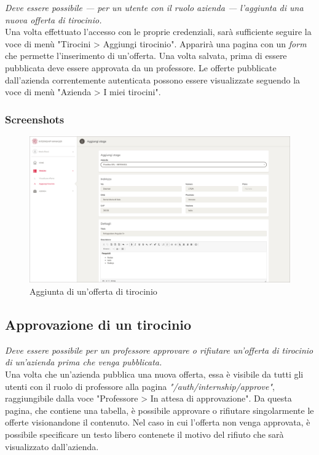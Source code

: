 \textit{Deve essere possibile --- per un utente con il ruolo azienda --- l'aggiunta di una nuova offerta di tirocinio.} \\

\noindent
Una volta effettuato l'accesso con le proprie credenziali, sarà sufficiente seguire la voce di menù "Tirocini > Aggiungi tirocinio". Apparirà una pagina con un \textit{form} che permette l'inserimento di un'offerta. Una volta salvata, prima di essere pubblicata deve essere approvata da un professore. Le offerte pubblicate dall'azienda correntemente autenticata possono essere visualizzate seguendo la voce di menù "Azienda > I miei tirocini".

\subsubsection{Screenshots}
\begin{figure}[H]
	\centering
		\includegraphics[width=1\textwidth]{Chapter3/Figs/screenshots/addinternship}     
	\caption[Screenshot: aggiunta di un'offerta di tirocinio]{Aggiunta di un'offerta di tirocinio}
	\label{fig:screenshot:2}
\end{figure}

\pagebreak
\subsection{Approvazione di un tirocinio}\label{sec:approvazione-di-un-tirocinio}

\textit{Deve essere possibile per un professore approvare o rifiutare un'offerta di tirocinio di un'azienda prima che venga pubblicata.} \\

\noindent
Una volta che un'azienda pubblica una nuova offerta, essa è visibile da tutti gli utenti con il ruolo di professore alla pagina \textit{"/auth/internship/approve"}, raggiungibile dalla voce "Professore > In attesa di approvazione". Da questa pagina, che contiene una tabella, è possibile approvare o rifiutare singolarmente le offerte visionandone il contenuto. Nel caso in cui l'offerta non venga approvata, è possibile specificare un testo libero contenete il motivo del rifiuto che sarà visualizzato dall'azienda.

